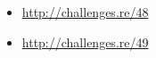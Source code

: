 \sectionold{\Exercises}

\begin{itemize}
	\item \url{http://challenges.re/48}
	\item \url{http://challenges.re/49}
\end{itemize}

